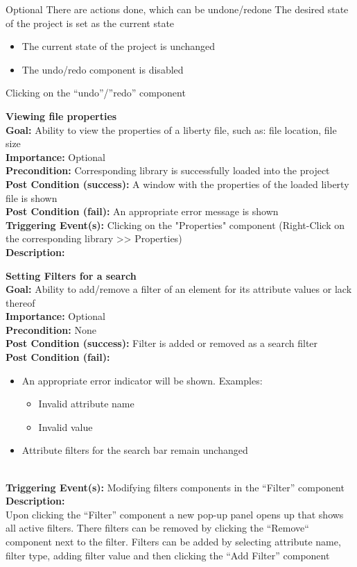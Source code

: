 \documentclass[10pt,a4paper]{report}
\newcommand{\precondition}[1]{
    \textbf{Precondition: } #1 \leavevmode \\
}
\newcommand{\FRDescription}[8]{
    \textbf{#1} \leavevmode \\
    \textbf{Goal: } #2 \leavevmode \\
    \textbf{Importance: } #3 \leavevmode \\
    \precondition{#4}
    \textbf{Post Condition (success): } #5 \leavevmode \\
    \textbf{Post Condition (fail): } #6 \leavevmode \\
    \textbf{Triggering Event(s): } #7 \leavevmode \\
    \textbf{Description: } \leavevmode \\ 
    #8}
\newcommand{\FRODescription}[8]{
    \textbf{#1} \leavevmode \\
    \textbf{Goal: } #2 \leavevmode \\
    \textbf{Importance: } #3 \leavevmode \\
    \precondition{#4}
    \textbf{Post Condition (success): } #5 \leavevmode \\
    \textbf{Post Condition (fail): } #6 \leavevmode \\
    \textbf{Triggering Event(s): } #7 \leavevmode \\
    \textbf{Description: } \leavevmode \\
    #8}
\begin{document}
\begin{FRO}
    {Optional}
    {There are actions done, which can be undone/redone}
    {The desired state of the project is set as the current state}
    {\begin{itemize}
        \item The current state of the project is unchanged
        \item The undo/redo component is disabled
    \end{itemize}}
    {Clicking on the “undo”/”redo” component}
    \item \FRODescription{Viewing file properties}
    {Ability to view the properties of a liberty file, such as: file location, file size}
    {Optional}
    {Corresponding library is successfully loaded into the project}
    {A window with the properties of the loaded liberty file is shown}
    {An appropriate error message is shown}
    {Clicking on the "Properties" component (Right-Click on the corresponding library  >> Properties)}
    \item \FRDescription{Setting Filters for a search}
    {Ability to add/remove a filter of an element for its attribute values or lack thereof}
    {Optional}
    {None}
    {Filter is added or removed as a search filter}
    {\begin{itemize}
        \item An appropriate error indicator will be shown. Examples:
        \begin{itemize}
            \item Invalid attribute name
            \item Invalid value
        \end{itemize}
        \item Attribute filters for the search bar remain unchanged
    \end{itemize}}
    {Modifying filters components in the “Filter” component}
    {Upon clicking the “Filter” component a new pop-up panel opens up that shows all active filters. There filters can be removed by clicking the “Remove“ component next to the filter. Filters can be added by selecting attribute name, filter type, adding filter value and then clicking the “Add Filter” component}

\end{FRO}
\end{document}
